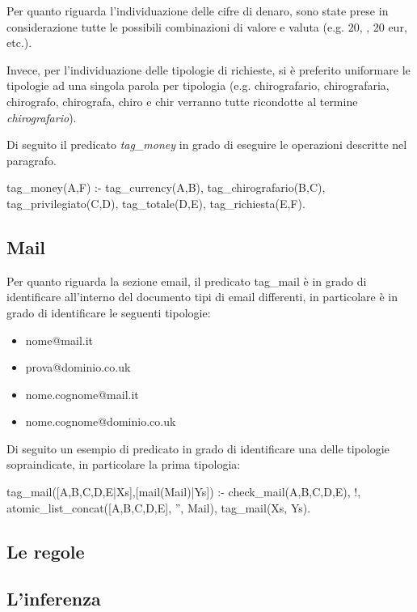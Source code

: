 Per quanto riguarda l'individuazione delle cifre di denaro, sono state prese in considerazione tutte le possibili combinazioni di valore e valuta (e.g. 20\texteuro, , 20 eur, etc.).

Invece, per l'individuazione delle tipologie di richieste, si è preferito uniformare le tipologie ad una singola parola per tipologia (e.g. chirografario, chirografaria, chirografo, chirografa, chiro e chir verranno tutte ricondotte al termine \emph{chirografario}).

Di seguito il predicato \emph{tag\_money} in grado di eseguire le operazioni descritte nel paragrafo.

\begin{prologcode}
tag_money(A,F) :- 
    tag_currency(A,B),
    tag_chirografario(B,C),
    tag_privilegiato(C,D),
    tag_totale(D,E),
    tag_richiesta(E,F).
\end{prologcode}

\subsection{Mail}
Per quanto riguarda la sezione email, il predicato tag\_mail è in grado di identificare all'interno del documento tipi di email differenti, in particolare è in grado di identificare le seguenti tipologie:
\begin{itemize}
\item nome@mail.it
\item prova@dominio.co.uk
\item nome.cognome@mail.it
\item nome.cognome@dominio.co.uk
\end{itemize}

Di seguito un esempio di predicato in grado di identificare una delle tipologie sopraindicate, in particolare la prima tipologia:

\begin{prologcode}
tag_mail([A,B,C,D,E|Xs],[mail(Mail)|Ys]) :-
    check_mail(A,B,C,D,E),
    !,
    atomic_list_concat([A,B,C,D,E], '', Mail),
    tag_mail(Xs, Ys).
\end{prologcode}




\subsection{Le regole}
\subsection{L'inferenza}
